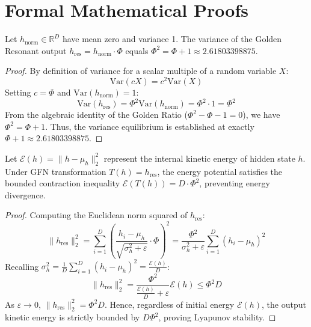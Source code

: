 \section{Formal Mathematical Proofs}

\begin{theorem}
Let $h_{\text{norm}} \in \mathbb{R}^D$ have mean zero and variance 1. The variance of the Golden Resonant output $h_{\text{res}} = h_{\text{norm}} \cdot \Phi$ equals $\Phi^2 = \Phi + 1 \approx 2.61803398875$.
\end{theorem}

\begin{proof}
By definition of variance for a scalar multiple of a random variable $X$:
\begin{equation}
    \text{Var}(c X) = c^2 \text{Var}(X)
\end{equation}
Setting $c = \Phi$ and $\text{Var}(h_{\text{norm}}) = 1$:
\begin{equation}
    \text{Var}(h_{\text{res}}) = \Phi^2 \text{Var}(h_{\text{norm}}) = \Phi^2 \cdot 1 = \Phi^2
\end{equation}
From the algebraic identity of the Golden Ratio ($\Phi^2 - \Phi - 1 = 0$), we have $\Phi^2 = \Phi + 1$. Thus, the variance equilibrium is established at exactly $\Phi + 1 \approx 2.61803398875$.
\end{proof}

\begin{theorem}
Let $\mathcal{E}(h) = \|h - \mu_h\|_2^2$ represent the internal kinetic energy of hidden state $h$. Under GFN transformation $T(h) = h_{\text{res}}$, the energy potential satisfies the bounded contraction inequality $\mathcal{E}(T(h)) = D \cdot \Phi^2$, preventing energy divergence.
\end{theorem}

\begin{proof}
Computing the Euclidean norm squared of $h_{\text{res}}$:
\begin{equation}
    \|h_{\text{res}}\|_2^2 = \sum_{i=1}^D \left( \frac{h_i - \mu_h}{\sqrt{\sigma_h^2 + \varepsilon}} \cdot \Phi \right)^2 = \frac{\Phi^2}{\sigma_h^2 + \varepsilon} \sum_{i=1}^D (h_i - \mu_h)^2
\end{equation}
Recalling $\sigma_h^2 = \frac{1}{D} \sum_{i=1}^D (h_i - \mu_h)^2 = \frac{\mathcal{E}(h)}{D}$:
\begin{equation}
    \|h_{\text{res}}\|_2^2 = \frac{\Phi^2}{\frac{\mathcal{E}(h)}{D} + \varepsilon} \mathcal{E}(h) \le \Phi^2 D
\end{equation}
As $\varepsilon \to 0$, $\|h_{\text{res}}\|_2^2 = \Phi^2 D$. Hence, regardless of initial energy $\mathcal{E}(h)$, the output kinetic energy is strictly bounded by $D \Phi^2$, proving Lyapunov stability.
\end{proof}